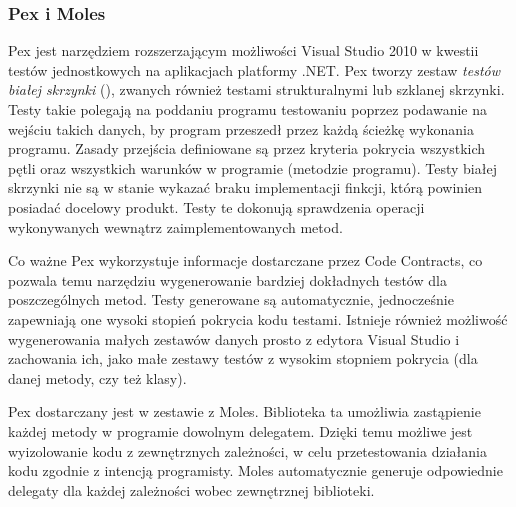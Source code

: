 \subsubsection{Pex i Moles\label{04:pex}}
Pex jest narzędziem rozszerzającym możliwości Visual Studio 2010 w kwestii testów jednostkowych na aplikacjach platformy .NET. Pex tworzy zestaw \emph{testów białej skrzynki} (), zwanych również testami strukturalnymi lub szklanej skrzynki. Testy takie polegają na poddaniu programu testowaniu poprzez podawanie na wejściu takich danych, by program przeszedł przez każdą ścieżkę wykonania programu. Zasady przejścia definiowane są przez kryteria pokrycia wszystkich pętli oraz wszystkich warunków w programie (metodzie programu). Testy białej skrzynki nie są w stanie wykazać braku implementacji finkcji, którą powinien posiadać docelowy produkt. Testy te dokonują sprawdzenia operacji wykonywanych wewnątrz zaimplementowanych metod. 

Co ważne Pex wykorzystuje informacje dostarczane przez Code Contracts, co pozwala temu narzędziu wygenerowanie bardziej dokładnych testów dla poszczególnych metod. Testy generowane są automatycznie, jednocześnie zapewniają one wysoki stopień pokrycia kodu testami. Istnieje również możliwość wygenerowania małych zestawów danych prosto z edytora Visual Studio i zachowania ich, jako małe zestawy testów z wysokim stopniem pokrycia (dla danej metody, czy też klasy).

Pex dostarczany jest w zestawie z Moles. Biblioteka ta umożliwia zastąpienie każdej metody w programie dowolnym delegatem. Dzięki temu możliwe jest wyizolowanie kodu z zewnętrznych zależności, w celu przetestowania działania kodu zgodnie z intencją programisty. Moles automatycznie generuje odpowiednie delegaty dla każdej zależności wobec zewnętrznej biblioteki.